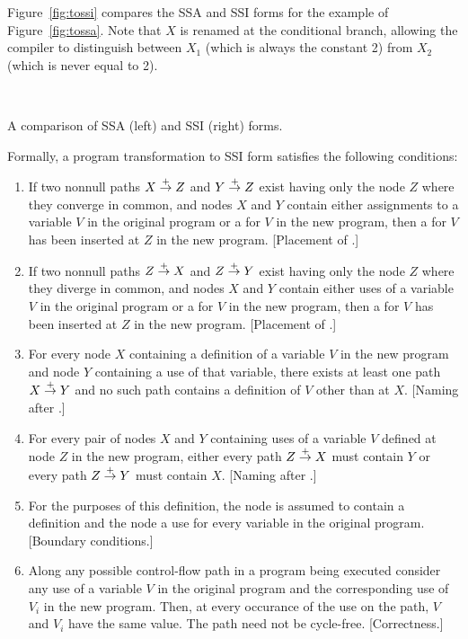 \documentclass[12pt,titlepage,twoside]{article}
\begin{document}
Figure~\vref{fig:tossi} compares the SSA and SSI forms for 
the example of Figure~\ref{fig:tossa}.  Note that $X$ is renamed at
the conditional branch, allowing the compiler to distinguish between
$X_1$ (which is always the constant 2) from $X_2$ (which is never
equal to 2).

\begin{myfigure}
\begin{center}
 \vline\ 
\end{center}
\caption[A comparison of SSA and SSI forms.]
{A comparison of SSA (left) and SSI (right) forms.}
\label{fig:tossi}
\end{myfigure}

Formally, a program transformation to SSI form satisfies the following
conditions:
\begin{enumerate}
\item If two nonnull paths $X \stackrel{+}{\rightarrow} Z$ and $Y \stackrel{+}{\rightarrow} Z$
exist having only the node $Z$ where they converge in common,
and nodes $X$ and $Y$ contain either assignments to a variable $V$ in the
original program or a \phisigfunction[or]{} for $V$ in the new program,
then a \phifunction{} for $V$ has been inserted at $Z$ in the new program.
[Placement of \phifunction{s}.] \label{crit_phiplace}

\item If two nonnull paths $Z \stackrel{+}{\rightarrow} X$ and $Z \stackrel{+}{\rightarrow} Y$
exist having only the node $Z$ where they diverge in common,
and nodes $X$ and $Y$ contain either uses of a variable $V$ in the
original program or a \phisigfunction[or]{} for $V$ in the new program,
then a \sigfunction{} for $V$ has been inserted at $Z$ in the new program.
[Placement of \sigfunction{s}.] \label{crit_sigplace}

\item For every node $X$ containing a definition of a variable $V$ in
the new program and node $Y$ containing a use of that variable, there
exists at least one path $X \stackrel{+}{\rightarrow} Y$ and no such path contains a
definition of $V$ other than at $X$. %
[Naming after .] \label{crit_phiname}

\item For every pair of nodes $X$ and $Y$ containing uses of a
variable $V$ defined at node $Z$ in the new program, either every path
$Z \stackrel{+}{\rightarrow} X$ must contain $Y$ or every path $Z \stackrel{+}{\rightarrow} Y$ must
contain $X$.
[Naming after .] \label{crit_signame}

\item For the purposes of this definition, the  node
is assumed to contain a definition and the \code{END} node a use for every
variable in the original program.
[Boundary conditions.] \label{crit_boundary}

\item Along any possible control-flow path in a program being executed
consider any use of a variable $V$ in the original program and the
corresponding use of $V_i$ in the new program.  Then, at every
occurance of the use on the path, $V$ and $V_i$ have the same value.
The path need not be cycle-free.
[Correctness.] \label{crit_correct}
\end{enumerate}
\end{document}
